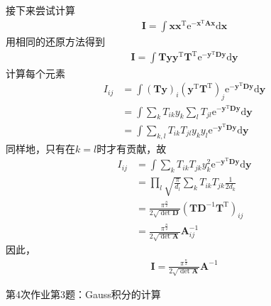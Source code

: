         接下来尝试计算
        \begin{align*}
            \bm{I} = \int \bm{xx}^\mathrm{T} \mathrm{e}^{-\bm{x}^\mathrm{T}\bm{Ax}}\mathrm{d}\bm{x}
        \end{align*}
        用相同的还原方法得到
        \begin{align*}
            \bm{I} = \int \bm{Ty}\bm{y}^\mathrm{T}\bm{T}^\mathrm{T} \mathrm{e}^{-\bm{y}^\mathrm{T}\bm{Dy}}\mathrm{d}\bm{y}
        \end{align*}
        计算每个元素
        \begin{align*}
            I_{ij} &= \int (\bm{Ty})_{i}(\bm{y}^\mathrm{T}\bm{T}^\mathrm{T})_{j} \mathrm{e}^{-\bm{y}^\mathrm{T}\bm{Dy}}\mathrm{d}\bm{y}\\
            &= \int \sum_k T_{ik}y_k \sum_l T_{jl} \mathrm{e}^{-\bm{y}^\mathrm{T}\bm{Dy}}\mathrm{d}\bm{y}\\
            &= \int \sum_{k,l} T_{ik}T_{jl} y_ky_l \mathrm{e}^{-\bm{y}^\mathrm{T}\bm{Dy}}\mathrm{d}\bm{y}
        \end{align*}
        同样地，只有在$k=l$时才有贡献，故
        \begin{align*}
            I_{ij} &= \int \sum_k T_{ik}T_{jk}y_k^2 \mathrm{e}^{-\bm{y}^\mathrm{T}\bm{Dy}}\mathrm{d}\bm{y}\\
            &= \prod_l \sqrt{\frac {\pi}{d_l}} \sum_k T_{ik}T_{jk} \frac 1{2d_k}\\
            &= \frac {\pi^{\frac n2}}{2 \sqrt{\det{\bm{D}}}} (\bm{TD}^{-1}\bm{T}^\mathrm{T})_{ij}\\
            &= \frac {\pi^{\frac n2}}{2 \sqrt{\det{\bm{A}}}} \bm{A}^{-1}_{ij}
        \end{align*}
        因此，
        \begin{align*}
            \bm{I} = \frac {\pi^{\frac n2}}{2 \sqrt{\det{\bm{A}}}} \bm{A}^{-1}
        \end{align*}
        \begin{asg}
            第4次作业第3题：Gauss积分的计算
        \end{asg}
        
        